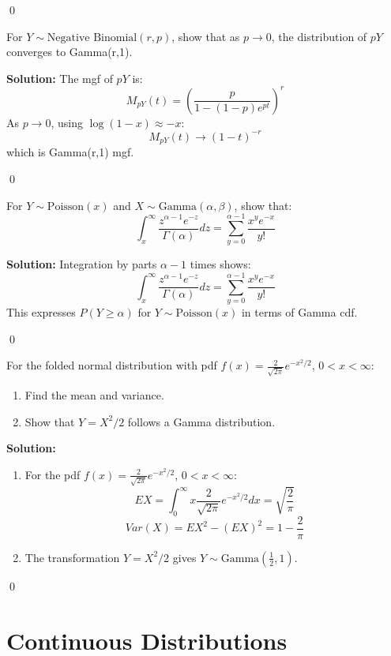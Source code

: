 \qed
\begin{problembox}
For \( Y \sim \text{Negative Binomial}(r,p) \), show that as \( p \to 0 \), the distribution of \( pY \) converges to Gamma(r,1).
\end{problembox}

\noindent\textbf{Solution:}
The mgf of \( pY \) is:
\[
M_{pY}(t) = \left(\frac{p}{1-(1-p)e^{pt}}\right)^r
\]
As \( p \to 0 \), using \( \log(1-x) \approx -x \):
\[
M_{pY}(t) \to (1-t)^{-r}
\]
which is Gamma(r,1) mgf.


\qed
\begin{problembox}
For \( Y \sim \text{Poisson}(x) \) and \( X \sim \text{Gamma}(\alpha,\beta) \), show that:
\[
\int_x^\infty \frac{z^{\alpha-1}e^{-z}}{\Gamma(\alpha)}dz = \sum_{y=0}^{\alpha-1} \frac{x^y e^{-x}}{y!}
\]
\end{problembox}

\noindent\textbf{Solution:}
Integration by parts \( \alpha-1 \) times shows:
\[
\int_x^\infty \frac{z^{\alpha-1}e^{-z}}{\Gamma(\alpha)}dz = \sum_{y=0}^{\alpha-1} \frac{x^y e^{-x}}{y!}
\]
This expresses \( P(Y \geq \alpha) \) for \( Y \sim \text{Poisson}(x) \) in terms of Gamma cdf.


\qed
\begin{problembox}
For the folded normal distribution with pdf \( f(x) = \frac{2}{\sqrt{2\pi}}e^{-x^2/2} \), \( 0<x<\infty \):
\begin{enumerate}[label=(\alph*)]
\item Find the mean and variance.
\item Show that \( Y = X^2/2 \) follows a Gamma distribution.
\end{enumerate}
\end{problembox}

\noindent\textbf{Solution:}
\begin{enumerate}[label=(\alph*)]
\item For the pdf $f(x) = \frac{2}{\sqrt{2\pi}}e^{-x^2/2}$, $0<x<\infty$:
\[
EX = \int_0^\infty x\frac{2}{\sqrt{2\pi}}e^{-x^2/2}dx = \sqrt{\frac{2}{\pi}}
\]
\[
Var(X) = EX^2 - (EX)^2 = 1 - \frac{2}{\pi}
\]

\item The transformation $Y = X^2/2$ gives $Y \sim \text{Gamma}(\frac{1}{2},1)$.
\end{enumerate}


\qed
\section{Continuous Distributions}

